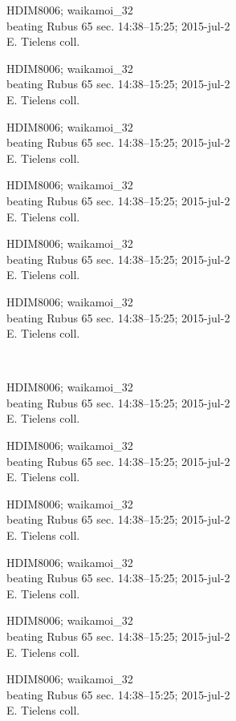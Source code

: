 \documentclass[2pt]{extarticle}
\begin{document}
\noindent
\parbox{0.16\textwidth}{\tiny \raggedright \rule[-0.3\baselineskip]{0pt}{10pt}HDIM8006; waikamoi\_32\\ beating Rubus 65 sec. 14:38--15:25; 2015-jul-2\\ E. Tielens coll.}
\parbox{0.16\textwidth}{\tiny \raggedright \rule[-0.3\baselineskip]{0pt}{10pt}HDIM8006; waikamoi\_32\\ beating Rubus 65 sec. 14:38--15:25; 2015-jul-2\\ E. Tielens coll.}
\parbox{0.16\textwidth}{\tiny \raggedright \rule[-0.3\baselineskip]{0pt}{10pt}HDIM8006; waikamoi\_32\\ beating Rubus 65 sec. 14:38--15:25; 2015-jul-2\\ E. Tielens coll.}
\parbox{0.16\textwidth}{\tiny \raggedright \rule[-0.3\baselineskip]{0pt}{10pt}HDIM8006; waikamoi\_32\\ beating Rubus 65 sec. 14:38--15:25; 2015-jul-2\\ E. Tielens coll.}
\parbox{0.16\textwidth}{\tiny \raggedright \rule[-0.3\baselineskip]{0pt}{10pt}HDIM8006; waikamoi\_32\\ beating Rubus 65 sec. 14:38--15:25; 2015-jul-2\\ E. Tielens coll.}
\parbox{0.16\textwidth}{\tiny \raggedright \rule[-0.3\baselineskip]{0pt}{10pt}HDIM8006; waikamoi\_32\\ beating Rubus 65 sec. 14:38--15:25; 2015-jul-2\\ E. Tielens coll.} \\ 
\vspace{0.001in} 

\noindent
\parbox{0.16\textwidth}{\tiny \raggedright \rule[-0.3\baselineskip]{0pt}{10pt}HDIM8006; waikamoi\_32\\ beating Rubus 65 sec. 14:38--15:25; 2015-jul-2\\ E. Tielens coll.}
\parbox{0.16\textwidth}{\tiny \raggedright \rule[-0.3\baselineskip]{0pt}{10pt}HDIM8006; waikamoi\_32\\ beating Rubus 65 sec. 14:38--15:25; 2015-jul-2\\ E. Tielens coll.}
\parbox{0.16\textwidth}{\tiny \raggedright \rule[-0.3\baselineskip]{0pt}{10pt}HDIM8006; waikamoi\_32\\ beating Rubus 65 sec. 14:38--15:25; 2015-jul-2\\ E. Tielens coll.}
\parbox{0.16\textwidth}{\tiny \raggedright \rule[-0.3\baselineskip]{0pt}{10pt}HDIM8006; waikamoi\_32\\ beating Rubus 65 sec. 14:38--15:25; 2015-jul-2\\ E. Tielens coll.}
\parbox{0.16\textwidth}{\tiny \raggedright \rule[-0.3\baselineskip]{0pt}{10pt}HDIM8006; waikamoi\_32\\ beating Rubus 65 sec. 14:38--15:25; 2015-jul-2\\ E. Tielens coll.}
\parbox{0.16\textwidth}{\tiny \raggedright \rule[-0.3\baselineskip]{0pt}{10pt}HDIM8006; waikamoi\_32\\ beating Rubus 65 sec. 14:38--15:25; 2015-jul-2\\ E. Tielens coll.} \\ 
\vspace{0.001in} 
\end{document}
